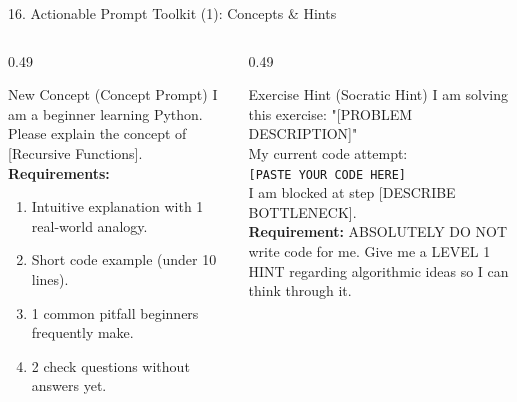 \documentclass[aspectratio=169, 10pt]{beamer}
\begin{document}
\begin{frame}{16. Actionable Prompt Toolkit (1): Concepts \& Hints}
  \begin{columns}[T]
    \begin{column}{0.49\textwidth}
      \begin{cbox}[primaryblue]{New Concept (Concept Prompt)}
        \scriptsize
        I am a beginner learning Python. Please explain the concept of [Recursive Functions].\\[2pt]
        \textbf{Requirements:}
        \begin{enumerate}\setlength{\itemsep}{1pt}
          \item Intuitive explanation with 1 real-world analogy.
          \item Short code example (under 10 lines).
          \item 1 common pitfall beginners frequently make.
          \item 2 check questions without answers yet.
        \end{enumerate}
      \end{cbox}
    \end{column}
    \begin{column}{0.49\textwidth}
      \begin{cbox}[secondarygreen]{Exercise Hint (Socratic Hint)}
        \scriptsize
        I am solving this exercise: "[PROBLEM DESCRIPTION]"\\[2pt]
        My current code attempt:\\
        \texttt{[PASTE YOUR CODE HERE]}\\[2pt]
        I am blocked at step [DESCRIBE BOTTLENECK].\\[2pt]
        \textbf{Requirement:} ABSOLUTELY DO NOT write code for me. Give me a LEVEL 1 HINT regarding algorithmic ideas so I can think through it.
      \end{cbox}
    \end{column}
  \end{columns}
\end{frame}
\end{document}
